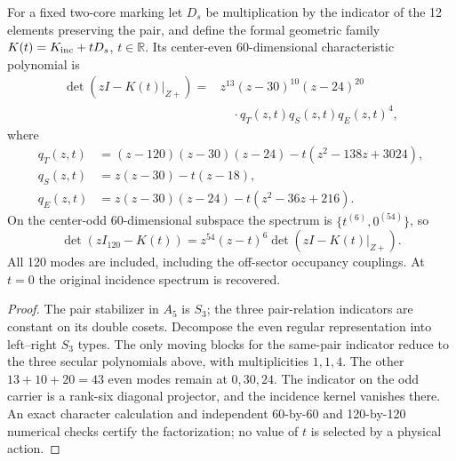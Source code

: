 \documentclass[12pt,a4paper]{article}
\begin{document}
\begin{theorem}
\label{p10:thm:v338-full-occupancy-secular}
For a fixed two-core marking let $D_s$ be multiplication by the
indicator of the 12 elements preserving the pair, and define the
formal geometric family $K(t)=K_{\rm inc}+tD_s$, $t\in\mathbb R$.
Its center-even 60-dimensional characteristic polynomial is
\[
 \begin{split}
 \det(zI-K(t)|_{Z+})={}&z^{13}(z-30)^{10}(z-24)^{20}\\
 &\quad\cdot q_T(z,t)q_S(z,t)q_E(z,t)^4,
 \end{split}
\]
where
\[
 \begin{split}
 q_T(z,t)&=(z-120)(z-30)(z-24)
          -t(z^2-138z+3024),\\
 q_S(z,t)&=z(z-30)-t(z-18),\\
 q_E(z,t)&=z(z-30)(z-24)
          -t(z^2-36z+216).
 \end{split}
\]
On the center-odd 60-dimensional subspace the spectrum is
$\{t^{(6)},0^{(54)}\}$, so
\[
 \det(zI_{120}-K(t))=z^{54}(z-t)^6
            \det(zI-K(t)|_{Z+}).
\]
All 120 modes are included, including the off-sector occupancy
couplings.  At $t=0$ the original incidence spectrum is recovered.
\end{theorem}
\begin{proof}
The pair stabilizer in $A_5$ is $S_3$; the three pair-relation
indicators are constant on its double cosets.  Decompose the even
regular representation into left--right $S_3$ types.  The only
moving blocks for the same-pair indicator reduce to the three
secular polynomials above, with multiplicities $1,1,4$.
The other $13+10+20=43$ even modes remain at $0,30,24$.
The indicator on the odd carrier is a rank-six diagonal projector,
and the incidence kernel vanishes there.  An exact character
calculation and independent 60-by-60 and 120-by-120 numerical
checks certify the factorization; no value of $t$ is selected by a
physical action.
\end{proof}
\end{document}

